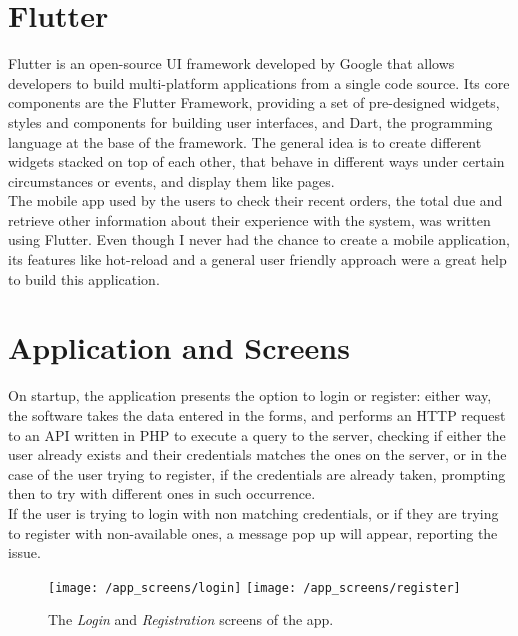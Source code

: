 \documentclass[target=bach,aauheader=,style=]{thud}
\begin{document}
\section{Flutter}
Flutter \cite{flutter} is an open-source UI framework developed by Google that allows developers to build multi-platform applications from a single code source. Its core components are the Flutter Framework, providing a set of pre-designed widgets, styles and components for building user interfaces, and Dart, the programming language at the base of the framework. 
The general idea is to create different widgets stacked on top of each other, that behave in different ways under certain circumstances or events, and display them like pages.\\

The mobile app used by the users to check their recent orders, the total due and retrieve other information about their experience with the system, was written using Flutter.
Even though I never had the chance to create a mobile application, its features like hot-reload and a general user friendly approach were a great help to build this application. 

\section{Application and Screens}


On startup, the application presents the option to login or register: either way, the software takes the data entered in the forms, and performs an HTTP request to an API written in PHP to execute a query to the server, checking if either the user already exists and their credentials matches the ones on the server, or in the case of the user trying to register, if the credentials are already taken, prompting then to try with different ones in such occurrence.\\
If the user is trying to login with non matching credentials, or if they are trying to register with non-available ones, a message pop up will appear, reporting the issue.
\newpage

\begin{figure}[h!]
	
	\centering
	\texttt{[image: /app\_screens/login]} %
	\space\space\space\space
	\texttt{[image: /app\_screens/register]} %
	\caption{The \emph{Login} and \emph{Registration} screens of the app.}
	\label{fig:app1}
	
\end{figure}
\end{document}

